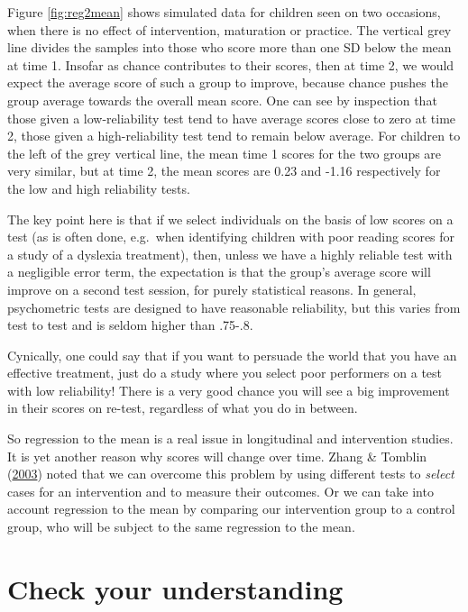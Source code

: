\documentclass{krantz}
\begin{document}
Figure \ref{fig:reg2mean} shows simulated data for children seen on two occasions, when there is no effect of intervention, maturation or practice. The vertical grey line divides the samples into those who score more than one SD below the mean at time 1. Insofar as chance contributes to their scores, then at time 2, we would expect the average score of such a group to improve, because chance pushes the group average towards the overall mean score. One can see by inspection that those given a low-reliability test tend to have average scores close to zero at time 2, those given a high-reliability test tend to remain below average. For children to the left of the grey vertical line, the mean time 1 scores for the two groups are very similar, but at time 2, the mean scores are 0.23 and -1.16 respectively for the low and high reliability tests.

The key point here is that if we select individuals on the basis of low scores on a test (as is often done, e.g.~when identifying children with poor reading scores for a study of a dyslexia treatment), then, unless we have a highly reliable test with a negligible error term, the expectation is that the group's average score will improve on a second test session, for purely statistical reasons. In general, psychometric tests are designed to have reasonable reliability, but this varies from test to test and is seldom higher than .75-.8.

Cynically, one could say that if you want to persuade the world that you have an effective treatment, just do a study where you select poor performers on a test with low reliability! There is a very good chance you will see a big improvement in their scores on re-test, regardless of what you do in between.

So regression to the mean is a real issue in longitudinal and intervention studies. It is yet another reason why scores will change over time. Zhang \& Tomblin (\protect\hyperlink{ref-zhang2003}{2003}) noted that we can overcome this problem by using different tests to \emph{select} cases for an intervention and to measure their outcomes. Or we can take into account regression to the mean by comparing our intervention group to a control group, who will be subject to the same regression to the mean.

\hypertarget{check-your-understanding-4}{%
\section{Check your understanding}\label{check-your-understanding-4}}
\end{document}
